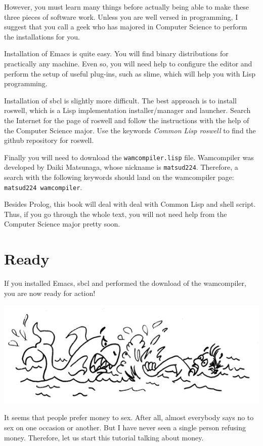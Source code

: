 \documentclass[a4paper,12pt]{book}
\begin{document}
However, you must learn many things before actually being
able to make these three pieces of software work. 
Unless you are well versed in programming, I suggest that
you call a geek who has majored in Computer Science to perform
the installations for you.

Installation of Emacs is quite easy. You will find binary
distributions for practically any machine. Even so, you
will need help to configure the editor and perform the
setup of useful plug-ins, such as slime, which will help
you with Lisp programming.

Installation of sbcl is slightly more difficult. The
best approach is to install roswell, which is a Lisp
implementation installer/manager and launcher. Search
the Internet for the page of roswell and follow the
instructions with the help of the Computer Science major.
Use the keywords {\em Common Lisp roswell} to find the
github repository for roswell.

Finally you will need to download the \verb|wamcompiler.lisp|
file. Wamcompiler was developed by Daiki Matsunaga, whose
nickname is \verb|matsud224|. Therefore, a search with the
following keywords should land on the wamcompiler page:
\verb|matsud224 wamcompiler|.

Besides Prolog, this book will deal with deal with Common
Lisp and shell script. Thus, if you go through the whole
text, you will not need help from the Computer Science
major pretty soon.

\section{Ready}
If you installed Emacs, sbcl and performed the download
of the wamcompiler, you are now ready for action!

\includegraphics{figs-prefix/readyforaction.jpg}

It seems that people prefer money to sex.
After all, almost everybody says no to
sex on one occasion or another.
But I have never seen a single
person refusing money. Therefore, let us
start this tutorial talking about money.
\end{document}
